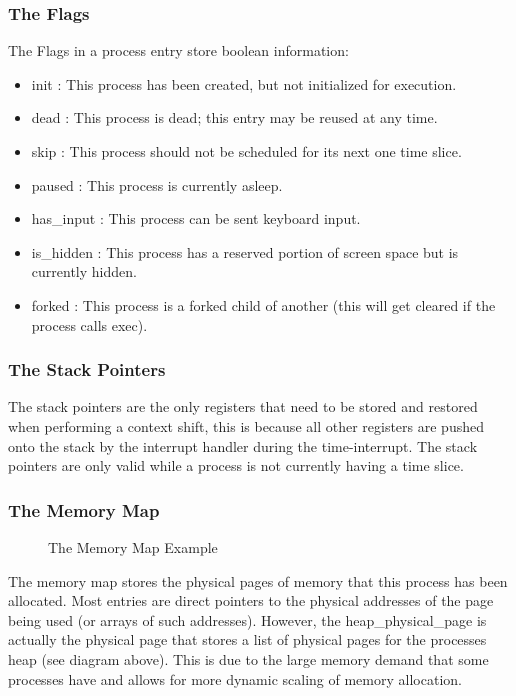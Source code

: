 \documentclass[a4paper]{report}
\begin{document}
\subsubsection{The Flags}

The Flags in a process entry store boolean information:
\begin{itemize}
\item init : This process has been created, but not initialized for execution.
\item dead : This process is dead; this entry may be reused at any time.
\item skip : This process should not be scheduled for its next one time slice.
\item paused : This process is currently asleep.
\item has\_input : This process can be sent keyboard input.
\item is\_hidden : This process has a reserved portion of screen space but is currently hidden.
\item forked : This process is a forked child of another (this will get cleared if the process calls exec).
\end{itemize}

\subsubsection{The Stack Pointers}
The stack pointers are the only registers that need to be stored and restored when performing a context shift, this is because all other registers are pushed onto the stack by the interrupt handler during the time-interrupt. The stack pointers are only valid while a process is not currently having a time slice.

\subsubsection{The Memory Map}
\begin{figure}[ht]
  \centering

  \def\svgwidth{\columnwidth}
  \caption{The Memory Map Example}
  \label{fig:schedulerscreen}
\end{figure}

The memory map stores the physical pages of memory that this process has been allocated. Most entries are direct pointers to the physical addresses of the page being used (or arrays of such addresses). However, the heap\_physical\_page is actually the physical page that stores a list of physical pages for the processes heap (see diagram above). This is due to the large memory demand that some processes have and allows for more dynamic scaling of memory allocation.
\end{document}
